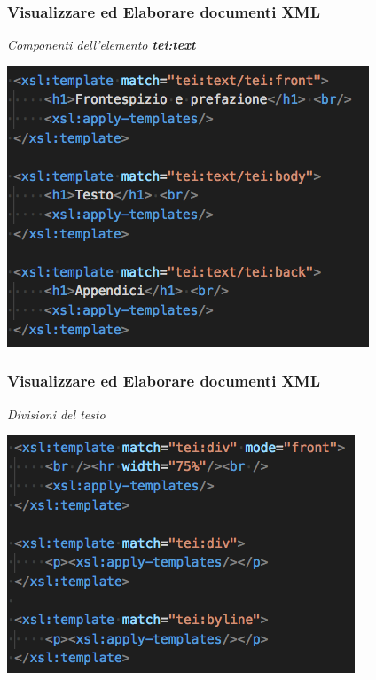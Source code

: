 \begin{frame}
    \frametitle{Visualizzare ed Elaborare documenti XML}
    \addtocounter{nframe}{1}
    
        \textit{Componenti dell'elemento \textbf{tei:text}}

    \begin{center}
        \includegraphics[width=.8\textwidth]{imgs/EsempioCommentato4.png}
    \end{center}

\end{frame}

\begin{frame}
    \frametitle{Visualizzare ed Elaborare documenti XML}
    \addtocounter{nframe}{1}
    
        \textit{Divisioni del testo}

    \begin{center}
        \includegraphics[width=.8\textwidth]{imgs/EsempioCommentato5.png}
    \end{center}

\end{frame}


